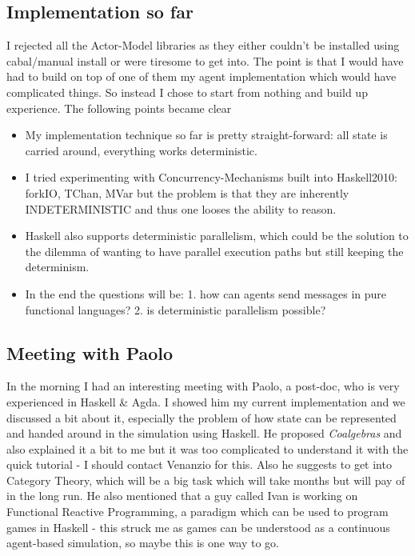 \subsection*{Implementation so far}
I rejected all the Actor-Model libraries as they either couldn't be installed using cabal/manual install or were tiresome to get into. The point is that I would have had to build on top of one of them my agent implementation which would have complicated things. So instead I chose to start from nothing and build up experience. The following points became clear

\begin{itemize}
\item My implementation technique so far is pretty straight-forward: all state is carried around, everything works deterministic.
\item I tried experimenting with Concurrency-Mechanisms built into Haskell2010: forkIO, TChan, MVar but the problem is that they are inherently INDETERMINISTIC and thus one looses the ability to reason.
\item Haskell also supports deterministic parallelism, which could be the solution to the dilemma of wanting to have parallel execution paths but still keeping the determinism.
\item In the end the questions will be: 1. how can agents send messages in pure functional languages? 2. is deterministic parallelism possible?
\end{itemize}

\subsection*{Meeting with Paolo}
In the morning I had an interesting meeting with Paolo, a post-doc, who is very experienced in Haskell \& Agda. I showed him my current implementation and we discussed a bit about it, especially the problem of how state can be represented and handed around in the simulation using Haskell. He proposed \textit{Coalgebras} and also explained it a bit to me but it was too complicated to understand it with the quick tutorial - I should contact Venanzio for this. Also he suggests to get into Category Theory, which will be a big task which will take months but will pay of in the long run. He also mentioned that a guy called Ivan is working on Functional Reactive Programming, a paradigm which can be used to program games in Haskell - this struck me as games can be understood as a continuous agent-based simulation, so maybe this is one way to go.


